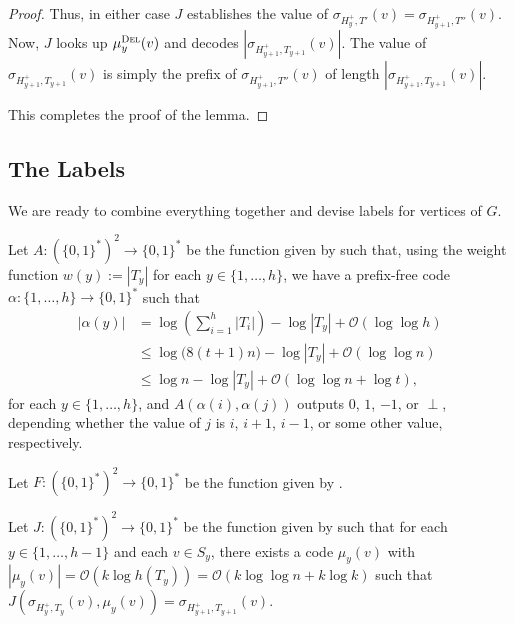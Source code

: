 \documentclass[kpfonts]{patmorin}
\newcommand{\Oh}{\mathcal{O}}
\let\leq\leqslant
\begin{document}
\begin{proof}
  Thus, in either case $J$ establishes the value of $\sigma_{H^+_y,T'}(v) = \sigma_{H^+_{y+1},T''}(v)$. 
  Now, $J$ looks up $\mu_y^{\textsc{Del}}(v)$ and decodes $|\sigma_{H^{+}_{y+1},T_{y+1}}(v)|$.
  The value of $\sigma_{H^{+}_{y+1},T_{y+1}}(v)$ is simply the prefix of $\sigma_{H^+_{y+1},T''}(v)$ of length $|\sigma_{H^{+}_{y+1},T_{y+1}}(v)|$.

  This completes the proof of the lemma.
\end{proof}

\subsection{The Labels}

We are ready to combine everything together and devise labels for vertices of $G$.

Let $A:(\{0,1\}^{*})^2\to\{0,1\}^*$ be the function given by  such that, 
using the weight function $w(y):=|T_y|$ for each $y\in\{1,\dots,h\}$,
we have a prefix-free code $\alpha:\{1,\dots,h\}\to\{0,1\}^*$ such that
\begin{align*}
|\alpha(y)|&=\log\left(\textstyle\sum_{i=1}^h|T_i|\right) - \log|T_y| + \Oh(\log\log h)\\
&\leq \log\bigl( 8(t+1)n\bigr) - \log|T_y| + \Oh(\log\log n)\\
&\leq \log n -\log|T_y| + \Oh(\log\log n + \log t),
\end{align*}
for each $y\in\{1,\dots,h\}$, and $A(\alpha(i),\alpha(j))$ outputs $0$, $1$, $-1$, or $\perp$, depending whether the value of $j$ is $i$, $i+1$, $i-1$, or some other value, respectively.


Let $F:(\{0,1\}^{*})^2\to\{0,1\}^*$ be the function given by .


Let $J:(\{0,1\}^{*})^2\to\{0,1\}^*$ be the function given by  such that
for each $y\in\{1,\dots,h-1\}$ and each $v\in S_{y}$,
there exists a code $\mu_{y}(v)$ with $|\mu_{y}(v)|=\Oh(k\log h(T_{y}))=\Oh(k\log\log n+k \log k)$ such that $J(\sigma_{H^+_y,T_{y}}(v),\mu_{y}(v))=\sigma_{H^+_{y+1},T_{y+1}}(v)$.
\end{document}
